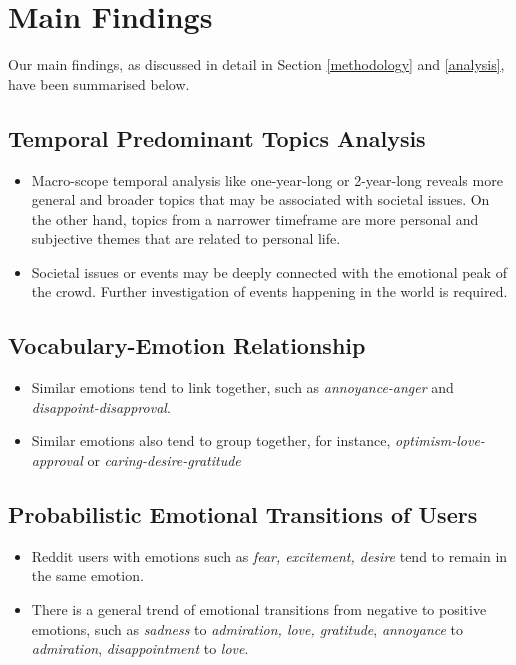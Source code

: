 \documentclass[conference,compsoc]{IEEEtran}
\begin{document}
\section{Main Findings}

Our main findings, as discussed in detail in Section \ref{methodology} and \ref{analysis}, have been summarised below. 

\subsection{Temporal Predominant Topics Analysis}
\begin{itemize}
    \item Macro-scope temporal analysis like one-year-long or 2-year-long reveals more general and broader topics that may be associated with societal issues. On the other hand, topics from a narrower timeframe are more personal and subjective themes that are related to personal life. 
    \item Societal issues or events may be deeply connected with the emotional peak of the crowd. Further investigation of events happening in the world is required. 
\end{itemize}
\subsection{Vocabulary-Emotion Relationship}
\begin{itemize}
    \item Similar emotions tend to link together, such as \textit{annoyance-anger} and \textit{disappoint-disapproval}.
    \item Similar emotions also tend to group together, for instance, \textit{optimism-love-approval} or \textit{caring-desire-gratitude}
\end{itemize}
\subsection{Probabilistic Emotional Transitions of Users}
\begin{itemize}
    \item Reddit users with emotions such as \textit{fear, excitement, desire} tend to remain in the same emotion. 
    \item There is a general trend of emotional transitions from negative to positive emotions, such as \textit{sadness} to \textit{admiration, love, gratitude}, \textit{annoyance} to \textit{admiration}, \textit{disappointment} to \textit{love}.
\end{itemize}
\end{document}
